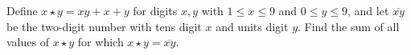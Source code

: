 Define $x\star y=xy+x+y$ for digits $x,y$ with $1\le x\le9$ and $0\le y\le9$, and let $\overline{xy}$ be the two-digit number with tens digit $x$ and units digit $y$. Find the sum of all values of $x\star y$ for which $x\star y=\overline{xy}$.
